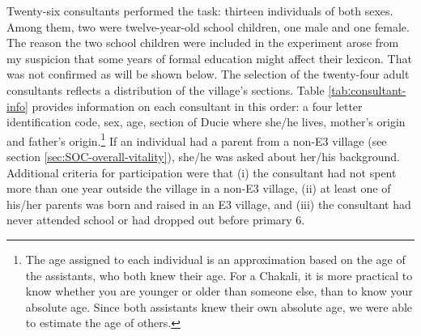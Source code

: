 Twenty-six consultants performed  the task: thirteen individuals of both sexes.
Among them, two were twelve-year-old school children, one male and one female.
The reason the two school children were included in the experiment arose from my
 suspicion that some years of formal education might affect their lexicon. That
was not confirmed as  will be shown below. The selection of the twenty-four
adult consultants reflects a distribution of the village's sections. Table
\ref{tabːconsultant-info} provides information on each consultant in this order:
a four letter identification code, sex, age, section of Ducie where she/he
lives, mother's origin and father's origin.\footnote{The age assigned to each
individual is an approximation based on the age of the assistants, who both knew
their age. For a Chakali, it is more practical to know whether you are younger
or older than someone else, than to know your absolute age. Since both
assistants knew their own absolute age, we were able to estimate the age of
others.} If an individual had a parent from a non-E3 village (see section
\ref{sec:SOC-overall-vitality}),  she/he was asked about her/his background.
Additional criteria for
participation were that (i) the consultant had not spent more than one year
outside the village in a non-E3 village, (ii) at least one of his/her parents
was born and raised in an E3 village,  and (iii) the consultant had never
attended school or had dropped out before primary 6.

